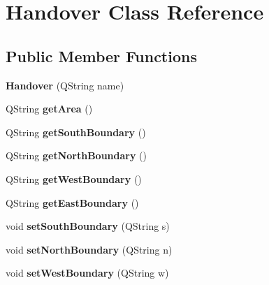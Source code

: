 \hypertarget{class_handover}{}\section{Handover Class Reference}
\label{class_handover}
\subsection*{Public Member Functions}
\begin{DoxyCompactItemize}
\item 
{\bfseries Handover} (Q\+String name)\hypertarget{class_handover_a3968494fea0cf12ab6d434873ccf2e4a}{}\label{class_handover_a3968494fea0cf12ab6d434873ccf2e4a}

\item 
Q\+String {\bfseries get\+Area} ()\hypertarget{class_handover_a35fd85a91c585d59ad571e3868ac1a3c}{}\label{class_handover_a35fd85a91c585d59ad571e3868ac1a3c}

\item 
Q\+String {\bfseries get\+South\+Boundary} ()\hypertarget{class_handover_aff7ba9e3b157a4de64f5eb0e989cf963}{}\label{class_handover_aff7ba9e3b157a4de64f5eb0e989cf963}

\item 
Q\+String {\bfseries get\+North\+Boundary} ()\hypertarget{class_handover_a6a3781fc668d75b1fb9e94ee6e34b1b2}{}\label{class_handover_a6a3781fc668d75b1fb9e94ee6e34b1b2}

\item 
Q\+String {\bfseries get\+West\+Boundary} ()\hypertarget{class_handover_ac9d0ef7aafbce56b0c18df58a8601067}{}\label{class_handover_ac9d0ef7aafbce56b0c18df58a8601067}

\item 
Q\+String {\bfseries get\+East\+Boundary} ()\hypertarget{class_handover_a8d111e4e364c16198889586fb9c619c4}{}\label{class_handover_a8d111e4e364c16198889586fb9c619c4}

\item 
void {\bfseries set\+South\+Boundary} (Q\+String s)\hypertarget{class_handover_afa126987496abe80cbb6de8c16d28be3}{}\label{class_handover_afa126987496abe80cbb6de8c16d28be3}

\item 
void {\bfseries set\+North\+Boundary} (Q\+String n)\hypertarget{class_handover_aa77c9c5f2fb7f665a425599296fe4747}{}\label{class_handover_aa77c9c5f2fb7f665a425599296fe4747}

\item 
void {\bfseries set\+West\+Boundary} (Q\+String w)\hypertarget{class_handover_abe83ab4ff5cf62db95d843042a1eb4aa}{}\label{class_handover_abe83ab4ff5cf62db95d843042a1eb4aa}


\end{DoxyCompactItemize}
